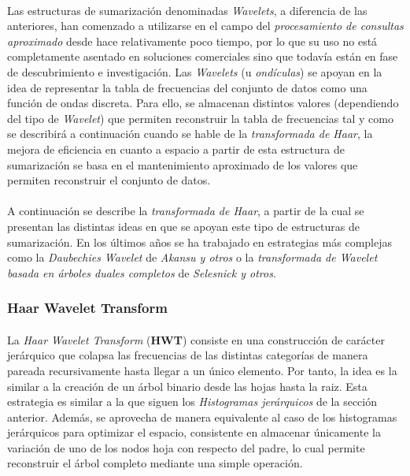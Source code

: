 \documentclass{subfiles}
\begin{document}
        \paragraph{}
        Las estructuras de sumarización denominadas \emph{Wavelets}, a diferencia de las anteriores, han comenzado a utilizarse en el campo del \emph{procesamiento de consultas aproximado} desde hace relativamente poco tiempo, por lo que su uso no está completamente asentado en soluciones comerciales sino que todavía están en fase de descubrimiento e investigación. Las \emph{Wavelets} (u \emph{ondículas}) se apoyan en la idea de representar la tabla de frecuencias del conjunto de datos como una función de ondas discreta. Para ello, se almacenan distintos valores (dependiendo del tipo de \emph{Wavelet}) que permiten reconstruir la tabla de frecuencias tal y como se describirá a continuación cuando se hable de la \emph{transformada de Haar}, la mejora de eficiencia en cuanto a espacio a partir de esta estructura de sumarización se basa en el mantenimiento aproximado de los valores que permiten reconstruir el conjunto de datos.

        \paragraph{}
        A continuación se describe la \emph{transformada de Haar}, a partir de la cual se presentan las distintas ideas en que se apoyan este tipo de estructuras de sumarización. En los últimos años se ha trabajado en estrategias más complejas como la \emph{Daubechies Wavelet} \cite{akansu2001multiresolution} de \emph{Akansu y otros} o la \emph{transformada de Wavelet basada en árboles duales completos} \cite{selesnick2005dual} de \emph{Selesnick y otros}.

        \subsubsection{Haar Wavelet Transform}

          \paragraph{}
          La \emph{Haar Wavelet Transform} (\textbf{HWT}) consiste en una construcción de carácter jerárquico que colapsa las frecuencias de las distintas categorías de manera pareada recursivamente hasta llegar a un único elemento. Por tanto, la idea es la similar a la creación de un árbol binario desde las hojas hasta la raiz. Esta estrategia es similar a la que siguen los \emph{Histogramas jerárquicos} de la sección anterior. Además, se aprovecha de manera equivalente al caso de los histogramas jerárquicos para optimizar el espacio, consistente en almacenar únicamente la variación de uno de los nodos hoja con respecto del padre, lo cual permite reconstruir el árbol completo mediante una simple operación.
\end{document}
